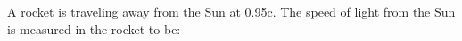 A rocket is traveling away from the Sun at 0.95c.  %
The speed of light from the Sun is measured in the rocket to be: %